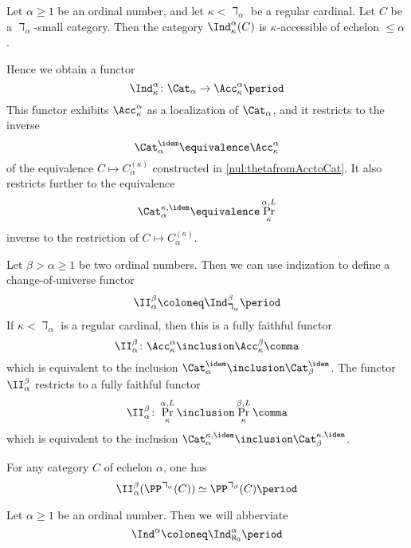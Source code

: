 \begin{eg}
	Let $ \alpha \geq 1 $ be an ordinal number, and
	let $ \kappa < \daleth_{\alpha} $ be a regular cardinal.
	Let $ C $ be a $ \daleth_{\alpha} $-small category.
	Then the category $ \Ind_{\kappa}^{\alpha}(C) $ is
	$ \kappa $-accessible of echelon $ \leq \alpha $.
	
	Hence we obtain a functor
	\[
		\Ind_{\kappa}^{\alpha} \colon
		\Cat_{\alpha} \to \Acc_{\kappa}^{\alpha} \period
	\]
	This functor exhibits $ \Acc_{\kappa}^{\alpha} $ as
	a localization of $ \Cat_{\alpha} $,
	and it restricts to the inverse
	\[ \Cat_{\alpha}^{\idem} \equivalence \Acc_{\kappa}^{\alpha} \]
	of the equivalence $ C \mapsto C_{\alpha}^{(\kappa)} $
	constructed in \eqref{nul:thetafromAcctoCat}.
	It also restricts further to the equivalence
	\[
		\Cat_{\alpha}^{\kappa,\idem} \equivalence
		\Pr^{\alpha,L}_{\kappa}
	\]
	inverse to the restriction of
	$ C \mapsto C_{\alpha}^{(\kappa)} $.
\end{eg}

\begin{construction}
	Let $ \beta > \alpha \geq 1 $ be two ordinal numbers.
	Then we can use indization to define 
	a change-of-universe functor
	\[
		\II_{\alpha}^{\beta} \coloneq
		\Ind_{\daleth_{\alpha}}^{\beta} \period
	\]
	If $ \kappa < \daleth_{\alpha} $ is a regular cardinal,
	then this is a fully faithful functor
	\[
		\II_{\alpha}^{\beta} \colon
		\Acc_{\kappa}^{\alpha} \inclusion
		\Acc_{\kappa}^{\beta} \comma
	\]
	which is equivalent to the inclusion
	$ \Cat_{\alpha}^{\idem} \inclusion \Cat_{\beta}^{\idem} $.
	The functor $ \II_{\alpha}^{\beta} $ restricts to 
	a fully faithful functor
	\[
		\II_{\alpha}^{\beta} \colon
		\Pr^{\alpha,L}_{\kappa} \inclusion
		\Pr^{\beta,L}_{\kappa} \comma
	\]
	which is equivalent to the inclusion
	$ \Cat_{\alpha}^{\kappa,\idem} \inclusion \Cat_{\beta}^{\kappa,\idem} $.
\end{construction}

\begin{eg}
	For any category $ C $ of echelon $ \alpha $,
	one has
	\[
		\II_{\alpha}^{\beta}(\PP^{\daleth_{\alpha}}(C))
		\simeq \PP^{\daleth_{\beta}}(C) \period
	\]
\end{eg}

\begin{notation}
	Let $ \alpha \geq 1 $ be an ordinal number.
	Then we will abberviate
	\[
		\Ind^{\alpha} \coloneq \Ind_{\aleph_0}^{\alpha} \period
	\]
\end{notation}



